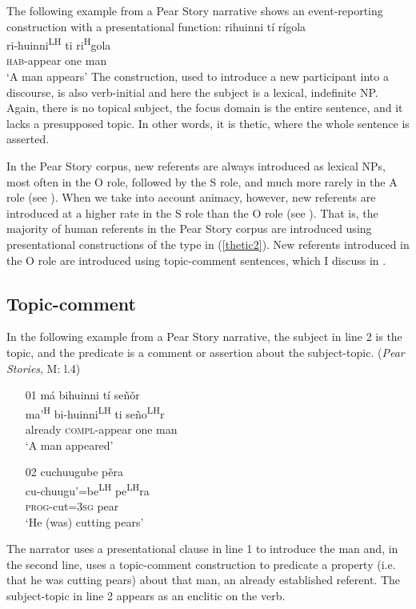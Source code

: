 The following example from a Pear Story narrative shows an event-reporting construction with a presentational function:
\ea\label{thetic2} 
\glll rihuinni t\'{i} r\'{i}gola  \\
ri-huinni\textsuperscript{LH} ti ri\textsuperscript{H}gola  \\
\textsc{hab}-appear one man  \\
\glt `A man appears' 
\z
The construction, used to introduce a new participant into a discourse, is also verb-initial and here the subject is a lexical, indefinite NP. Again, there is no topical subject, the focus domain is the entire sentence, and it lacks a presupposed topic. In other words, it is thetic, where the whole sentence is asserted. 

In the Pear Story corpus, new referents are always introduced as lexical NPs, most often in the O role, followed by the S role, and much more rarely in the A role (see ). When we take into account animacy, however, new referents are introduced at a higher rate in the S role than the O role (see ). That is, the majority of human referents in the Pear Story corpus are introduced using presentational constructions of the type in (\ref{thetic2}). New referents introduced in the O role are introduced using topic-comment sentences, which I discuss in .


\subsection{Topic-comment}\label{topiccommentsection}

In the following example from a Pear Story narrative, the subject in line 2 is the topic, and the predicate is a comment or assertion about the subject-topic. 
\ea\label{TC} (\textit{Pear Stories}, M: l.4)
\begin{itemize}
\item[01]
\glll m\'{a} bihuinni t\'{i} se\~{n}\v{o}r \\
ma'\textsuperscript{H} bi-huinni\textsuperscript{LH} ti se\~{n}o\textsuperscript{LH}r \\
already \textsc{compl}-appear one man \\
\glt `A man appeared' 


\item[02]
\glll cuchuugube p\v{e}ra \\
cu-chuugu'=be\textsuperscript{LH} pe\textsuperscript{LH}ra \\
\textsc{prog}-cut=\textsc{3sg} pear \\
\glt `He (was) cutting pears' 

\end{itemize}
\z
The narrator uses a presentational clause in line 1 to introduce the man and, in the second line, uses a topic-comment construction to predicate a property (i.e. that he was cutting pears) about that man, an already established referent. The subject-topic in line 2 appears as an enclitic on the verb. 

